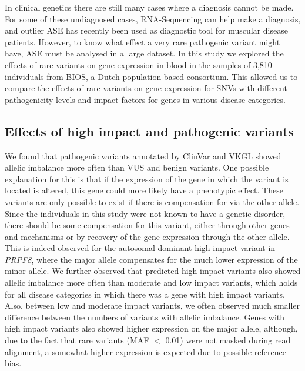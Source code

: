 In clinical genetics there are still many cases where a diagnosis cannot be made\cite{diemenRapidTargetedGenomics2017b}. For some of these undiagnosed cases, RNA-Sequencing can help make a diagnosis\cite{marco-pucheRNASeqPerspectivesImprove2019}, and outlier ASE has recently been used as diagnostic tool for muscular disease patients\cite{mohammadiGeneticRegulatoryVariation2019}. However, to know what effect a very rare pathogenic variant might have, ASE must be analysed in a large dataset. In this study we explored the effects of rare variants on gene expression in blood in the samples of 3,810 individuals from BIOS, a Dutch population-based consortium. This allowed us to compare the effects of rare variants on gene expression for SNVs with different pathogenicity levels and impact factors for genes in various disease categories.

\subsection{Effects of high impact and pathogenic variants}
We found that pathogenic variants annotated by ClinVar\cite{landrumClinVarImprovingAccess2018} and VKGL\cite{fokkemaDutchGenomeDiagnostic2019} showed allelic imbalance more often than VUS and benign variants. One possible explanation for this is that if the expression of the gene in which the variant is located is altered, this gene could more likely have a phenotypic effect. These variants are only possible to exist if there is compensation for via the other allele. Since the individuals in this study were not known to have a genetic disorder, there should be some compensation for this variant, either through other genes and mechanisms or by recovery of the gene expression through the other allele. This is indeed observed for the autosomal dominant high impact variant in \emph{PRPF8}, where the major allele compensates for the much lower expression of the minor allele. We further observed that predicted high impact variants also showed allelic imbalance more often than moderate and low impact variants, which holds for all disease categories in which there was a gene with high impact variants. Also, between low and moderate impact variants, we often observed much smaller difference between the numbers of variants with allelic imbalance. Genes with high impact variants also showed higher expression on the major allele, although, due to the fact that rare variants (MAF $<$ 0.01) were not masked during read alignment, a somewhat higher expression is expected due to possible reference bias.

